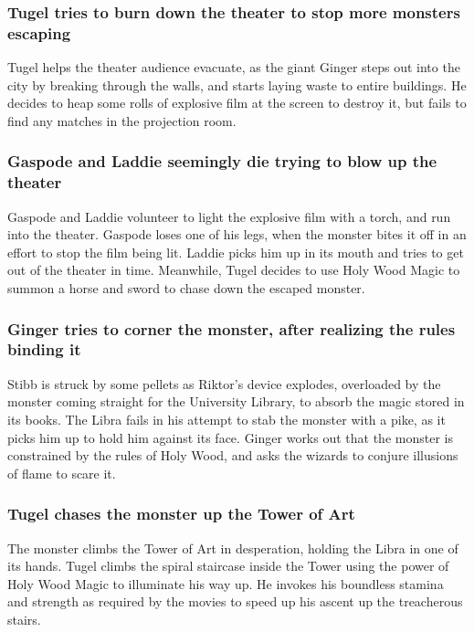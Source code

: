 \subsubsection{\Gls{Tugel} tries to burn down the theater to stop more monsters escaping}
\Gls{Tugel} helps the theater audience evacuate, as the giant \Gls{Ginger} steps out into the city
by breaking through the walls, and starts laying waste to entire buildings. He decides to heap
some rolls of explosive film at the screen to destroy it, but fails to find any matches in the
projection room.

\subsubsection{\Gls{Gaspode} and \Gls{Laddie} seemingly die trying to blow up the theater}
\Gls{Gaspode} and \Gls{Laddie} volunteer to light the explosive film with a torch, and run into the
theater. \Gls{Gaspode} loses one of his legs, when the monster bites it off in an effort to stop the
film being lit. \Gls{Laddie} picks him up in its mouth and tries to get out of the theater in time.
Meanwhile, \Gls{Tugel} decides to use Holy Wood Magic to summon a horse and sword to chase down the
escaped monster.

\subsubsection{\Gls{Ginger} tries to corner the monster, after realizing the rules binding it}
\Gls{Stibb} is struck by some pellets as \Gls{Riktor}'s device explodes, overloaded by the monster
coming straight for the University Library, to absorb the magic stored in its books. The \Gls{Libra}
fails in his attempt to stab the monster with a pike, as it picks him up to hold him against its
face. \Gls{Ginger} works out that the monster is constrained by the rules of Holy Wood, and asks
the wizards to conjure illusions of flame to scare it.

\subsubsection{\Gls{Tugel} chases the monster up the Tower of Art}
The monster climbs the Tower of Art in desperation, holding the \Gls{Libra} in one of its hands.
\Gls{Tugel} climbs the spiral staircase inside the Tower using the power of Holy Wood Magic to
illuminate his way up. He invokes his boundless stamina and strength as required by the movies to
speed up his ascent up the treacherous stairs.

